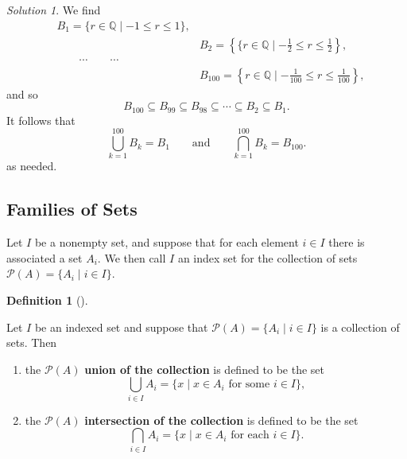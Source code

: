 \documentclass[
  letterpaper,
  10pt,
  reqno,
  twopage,
  openany]{book}
\providecommand{\tightlist}{%
  \setlength{\itemsep}{0pt}\setlength{\parskip}{0pt}}\usepackage{longtable,booktabs,array}
\theoremstyle{plain}
\theoremstyle{definition}
\theoremstyle{definition}
\newtheorem{definition}{Definition}[chapter]
\theoremstyle{definition}
\theoremstyle{plain}
\theoremstyle{plain}
\theoremstyle{remark}
\newtheorem*{solution}{Solution}
\begin{document}
\begin{solution}

We find \begin{align*}
& B_1=\{r\in \mathbb{Q} \mid -1 \leq r \leq 1\}, \\
& \qquad & B_2=\left\{\{r\in \mathbb{Q} \mid -\frac{1}{2} \leq r \leq \frac{1}{2}\right\}, \\
& \qquad \cdots \qquad \cdots \\
& & B_{100}=\left\{r\in \mathbb{Q} \mid -\frac{1}{100} \leq r \leq \frac{1}{100}\right\},  
\end{align*} and so \[
B_{100}\subseteq B_{99} \subseteq B_{98} \subseteq \cdots \subseteq B_2 \subseteq B_1.
\] It follows that \[
\bigcup_{k=1}^{100} B_k=B_1
\qquad \text{and} \qquad 
\bigcap_{k=1}^{100} B_k=B_{100}. 
\] as needed.

\end{solution}

\hypertarget{families-of-sets}{%
\subsection{Families of Sets}\label{families-of-sets}}

Let \(I\) be a nonempty set, and suppose that for each element
\(i\in I\) there is associated a set \(A_i.\) We then call \(I\) an
index set for the collection of sets
\(\mathcal{P}(A)=\{ A_i \mid i\in I\}.\)

\leavevmode{}%
\begin{definition}[]\label{def-union-of-the-collection}

Let \(I\) be an indexed set and suppose that
\(\mathcal{P}(A)=\{A_i\mid i\in I\}\) is a collection of sets. Then

\begin{enumerate}
\def\labelenumi{\arabic{enumi}.}
\tightlist
\item
  the  \(\mathcal{P}(A)\) \textbf{union
  of the collection} is defined to be the set
  \[ \bigcup_{i\in I} A_i  =\{x\mid x\in A_i \text{ for some } i\in I\},  \]
\item
  the  \(\mathcal{P}(A)\)
  \textbf{intersection of the collection} is defined to be the set
  \[ \bigcap_{i\in I} A_i  =\{x\mid x\in A_i \text{ for each } i\in I\}. \]
\end{enumerate}

\end{definition}
\end{document}
